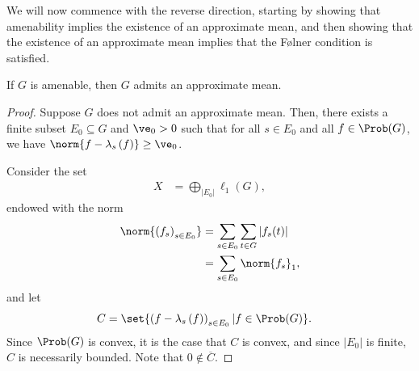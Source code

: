We will now commence with the reverse direction, starting by showing that amenability implies the existence of an approximate mean, and then showing that the existence of an approximate mean implies that the Følner condition is satisfied.
\begin{proposition}\label{prop:amenable_implies_approx_mean}
  If $G$ is amenable, then $G$ admits an approximate mean.
\end{proposition}
\begin{proof}
  Suppose $G$ does not admit an approximate mean. Then, there exists a finite subset $E_0\subseteq G$ and $\ve_0 > 0$ such that for all $s\in E_0$ and all $f\in \Prob(G)$, we have $\norm{f - \lambda_s\left(f\right)} \geq \ve_0$.\newline

  Consider the set
  \begin{align*}
    X &= \bigoplus_{\left\vert E_0 \right\vert} \ell_1\left(G\right),
  \end{align*}
  endowed with the norm
  \begin{align*}
    \norm{\left(f_s\right)_{s\in E_0}} &= \sum_{s\in E_0}\sum_{t\in G}\left\vert f_s(t) \right\vert\\
                                       &= \sum_{s\in E_0}\norm{f_s}_{1},
  \end{align*}
  and let
  \begin{align*}
    C &= \set{\left(f - \lambda_s\left(f\right)\right)_{s\in E_0} | f\in \Prob(G)}.
  \end{align*}
  Since $\Prob(G)$ is convex, it is the case that $C$ is convex, and since $\left\vert E_0 \right\vert$ is finite, $C$ is necessarily bounded. Note that $0\notin \overline{C}$.\newline


\end{proof}

